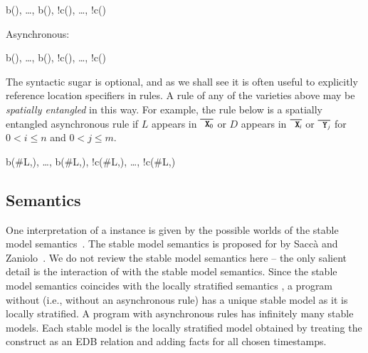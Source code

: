 \begin{Drules}
        {b(), \ldots, b(), !c(), \ldots, !c()}
\end{Drules}

%

Asynchronous:

\begin{Drules}
        {b(), \ldots, b(), !c(), \ldots, !c()}
\end{Drules}

The syntactic sugar is optional, and as we shall see it is often useful to explicitly reference location specifiers in rules.  A rule of any of the
varieties above may be \emph{spatially entangled} in this way. For example, the rule below is a spatially entangled asynchronous rule if $L$ appears
in $\od{X\sub{0}}$ or $D$ appears in $\od{X\sub{i}}$ or $\od{Y\sub{j}}$ for $0 <
i \leq n$ and $0 < j \leq m$. 

\begin{Drules}
        {b(#L,), \ldots, b(#L,), !c(#L,), \ldots, !c(#L,)}
\end{Drules}


\subsection{Semantics}
One interpretation of a \lang instance is given by the possible worlds of the
stable model semantics~\cite{stable-model}.  The stable model semantics is proposed for  by Sacc\`{a} and Zaniolo~\cite{sacca-zaniolo}.
We do not review the stable model
semantics here -- the only salient detail is the interaction of 
with the stable model semantics.  Since the stable model semantics coincides with the locally stratified semantics , a \lang program without  (i.e., without an asynchronous rule) has a unique stable model as it is locally stratified.  A \lang program with asynchronous rules has infinitely many stable models.  Each stable model is the locally stratified model obtained by treating the  construct as an EDB relation and adding facts for all chosen timestamps.


